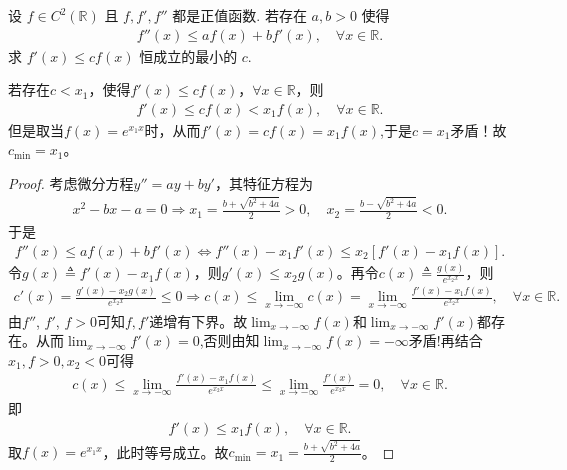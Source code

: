 \documentclass[../../main.tex]{subfiles}%
\begin{document}
\begin{example}
设 $f \in C^2(\mathbb{R})$ 且 $f, f', f''$ 都是正值函数. 若存在 $a, b > 0$ 使得
\begin{align*}
f''(x) \leqslant a f(x) + b f'(x), \quad \forall x \in \mathbb{R}.
\end{align*}
求 $f'(x) \leqslant c f(x)$ 恒成立的最小的 $c$.
\end{example}
\begin{remark}
若存在$c < x_1$，使得$f'(x) \leqslant c f(x)$，$\forall x \in \mathbb{R}$，则
\begin{align*}
f'(x) \leqslant c f(x) < x_1 f(x), \quad \forall x \in \mathbb{R}.
\end{align*}
但是取当$f(x) = e^{x_1 x}$时，从而$f'(x) =cf(x)= x_1 f(x)$,于是$c=x_1$矛盾！故$c_{\min} = x_1$。
\end{remark}
\begin{proof}
考虑微分方程$y'' = ay + by'$，其特征方程为
\begin{align*}
x^2 - bx - a = 0 \Rightarrow x_1 = \frac{b + \sqrt{b^2 + 4a}}{2} > 0, \quad x_2 = \frac{b - \sqrt{b^2 + 4a}}{2} < 0.
\end{align*}
于是
\begin{align*}
f''(x) \leqslant a f(x) + b f'(x) \Longleftrightarrow f''(x) - x_1 f'(x) \leqslant x_2 \left[ f'(x) - x_1 f(x) \right].
\end{align*}
令$g(x) \triangleq f'(x) - x_1 f(x)$，则$g'(x) \leqslant x_2 g(x)$。再令$c(x) \triangleq \frac{g(x)}{e^{x_2 x}}$，则
\begin{align*}
c'(x) = \frac{g'(x) - x_2 g(x)}{e^{x_2 x}} \leqslant 0 \Rightarrow c(x) \leqslant \lim_{x \rightarrow -\infty} c(x) = \lim_{x \rightarrow -\infty} \frac{f'(x) - x_1 f(x)}{e^{x_2 x}}, \quad \forall x \in \mathbb{R}.
\end{align*}
由$f''$, $f'$, $f > 0$可知$f, f'$递增有下界。故$\lim_{x \rightarrow -\infty} f(x)$和$\lim_{x \rightarrow -\infty} f'(x)$都存在。从而$\lim_{x \rightarrow -\infty} f'(x)=0$,否则由知$\lim_{x \rightarrow -\infty} f(x)=-\infty$矛盾!再结合$x_1,f>0,x_2<0$可得
\begin{align*}
c(x)\leqslant \lim_{x\rightarrow -\infty} \frac{f' (x)-x_1f(x)}{e^{x_2x}}\leqslant \lim_{x\rightarrow -\infty} \frac{f' (x)}{e^{x_2x}}=0,\quad \forall x\in \mathbb{R} .
\end{align*}
即
\begin{align*}
f'(x) \leqslant x_1 f(x), \quad \forall x \in \mathbb{R}.
\end{align*}
取$f(x) = e^{x_1 x}$，此时等号成立。故$c_{\min} = x_1 = \frac{b + \sqrt{b^2 + 4a}}{2}$。
\end{proof}
\end{document}

